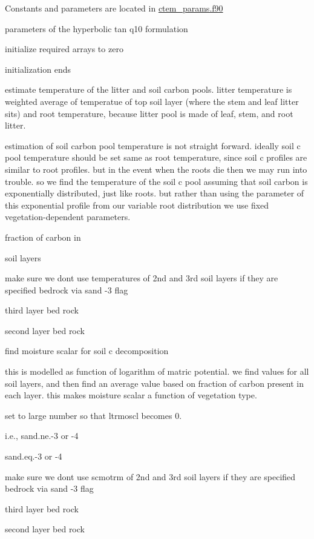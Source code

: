  Constants and parameters are located in \hyperlink{ctem__params_8f90}{ctem\+\_\+params.\+f90}

parameters of the hyperbolic tan q10 formulation 



initialize required arrays to zero

initialization ends 



estimate temperature of the litter and soil carbon pools. litter temperature is weighted average of temperatue of top soil layer (where the stem and leaf litter sits) and root temperature, because litter pool is made of leaf, stem, and root litter.

estimation of soil carbon pool temperature is not straight forward. ideally soil c pool temperature should be set same as root temperature, since soil c profiles are similar to root profiles. but in the event when the roots die then we may run into trouble. so we find the temperature of the soil c pool assuming that soil carbon is exponentially distributed, just like roots. but rather than using the parameter of this exponential profile from our variable root distribution we use fixed vegetation-\/dependent parameters.

fraction of carbon in

soil layers

make sure we don\textquotesingle{}t use temperatures of 2nd and 3rd soil layers if they are specified bedrock via sand -\/3 flag

third layer bed rock

second layer bed rock

find moisture scalar for soil c decomposition

this is modelled as function of logarithm of matric potential. we find values for all soil layers, and then find an average value based on fraction of carbon present in each layer. this makes moisture scalar a function of vegetation type.

set to large number so that ltrmoscl becomes 0.

i.\+e., sand.\+ne.-\/3 or -\/4

sand.\+eq.-\/3 or -\/4

make sure we don\textquotesingle{}t use scmotrm of 2nd and 3rd soil layers if they are specified bedrock via sand -\/3 flag

third layer bed rock

second layer bed rock

